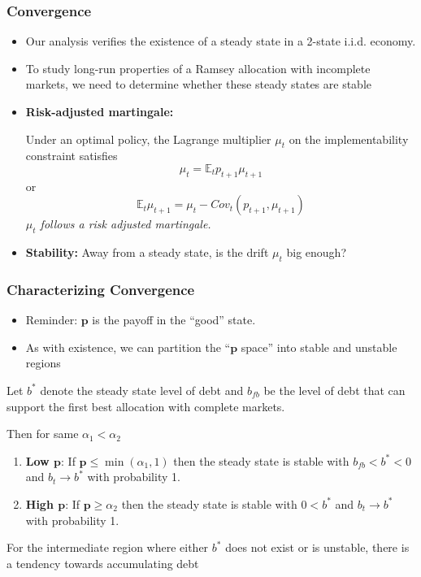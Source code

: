 \documentclass{beamer}
\newcommand{\EE}{\mathbb E}
\begin{document}
  
 \begin{frame}
  \frametitle{Convergence}
  \begin{itemize}
		\item Our analysis verifies the existence of a steady state in a 2-state i.i.d. economy.
		\item To study long-run properties of a Ramsey allocation with incomplete markets, we need to determine whether these steady states are stable
		\item \textbf{Risk-adjusted martingale:}
		
		Under an optimal policy, the Lagrange multiplier $\mu_t$ on the implementability  constraint   satisfies
		\[
			\mu_t = \EE_t p_{t+1} \mu_{t+1}
		\] or
		\[
		\EE_t  \mu_{t+1}	= \mu_t -Cov_t (p_{t+1}, \mu_{t+1})
		\]
			\emph{$\mu_t$ follows a risk adjusted martingale.}
	
		\item \textbf{Stability: }   Away from a steady state, is the drift  $\mu_t$ big enough?
		\end{itemize}
	
  
  \end{frame}
  
  \begin{frame}
  \frametitle{Characterizing Convergence}

  \begin{itemize}
  \item Reminder:  $\bm{p}$ is the payoff in the ``good'' state.
   \item As with existence, we can partition  the ``$\bm{p}$ space'' into stable and unstable regions
     \end{itemize}
     
 	\begin{theorem}
Let $b^*$ denote the steady state level of debt and $b_{fb}$ be the level of debt that can support the first best allocation with complete markets. 

Then for  same $  \alpha_1 < \alpha_2$
		\begin{enumerate}
			\item  \textbf{Low $\bm{p}$}: If $\bm{p}\leq\min(\alpha_1,1)$ then the steady state is stable with $b_{fb}<b^*<0$ and $b_t\rightarrow b^*$ with probability 1.
			\item \textbf{High  $\bm{p}$}:  If $\bm{p} \geq \alpha_2$ then the steady state is stable with $0<b^*$ and $b_t \rightarrow b^*$ with probability 1.
			
			
			\end{enumerate}
			\end{theorem}
			
			For the intermediate region where either $b^*$ does not exist or is unstable, there is a tendency towards accumulating debt
		
		
	
 \end{frame}
\end{document}
